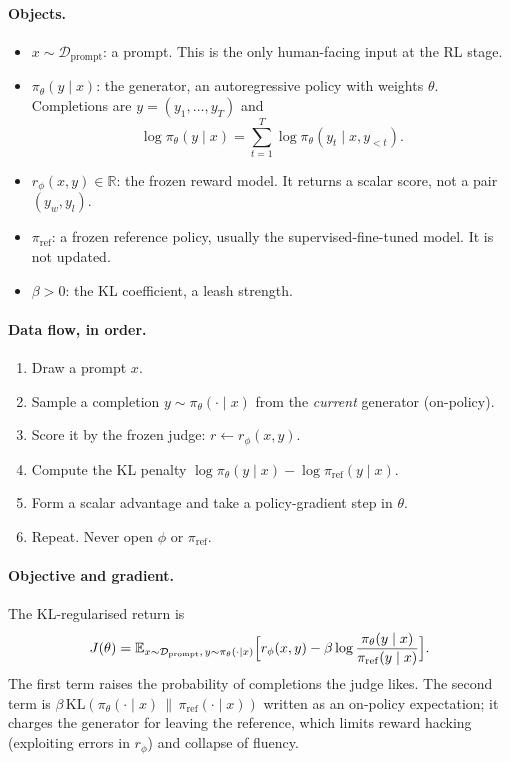\documentclass[11pt,a4paper]{article}
\theoremstyle{definition}
\begin{document}
\paragraph{Objects.}
\begin{itemize}
    \item \(x\sim\mathcal{D}_{\mathrm{prompt}}\): a prompt. This is the only human-facing input at the RL stage.
    \item \(\pi_\theta(y\mid x)\): the generator, an autoregressive policy with weights \(\theta\). Completions are \(y=(y_1,\ldots,y_T)\) and
    \[
    \log\pi_\theta(y\mid x)
    =\sum_{t=1}^{T}\log\pi_\theta(y_t\mid x,y_{<t}).
    \]
    \item \(r_\phi(x,y)\in\mathbb{R}\): the frozen reward model. It returns a scalar score, not a pair \((y_w,y_l)\).
    \item \(\pi_{\mathrm{ref}}\): a frozen reference policy, usually the supervised-fine-tuned model. It is not updated.
    \item \(\beta>0\): the KL coefficient, a leash strength.
\end{itemize}

\paragraph{Data flow, in order.}
\begin{enumerate}
    \item Draw a prompt \(x\).
    \item Sample a completion \(y\sim\pi_\theta(\cdot\mid x)\) from the \emph{current} generator (on-policy).
    \item Score it by the frozen judge: \(r\leftarrow r_\phi(x,y)\).
    \item Compute the KL penalty \(\log\pi_\theta(y\mid x)-\log\pi_{\mathrm{ref}}(y\mid x)\).
    \item Form a scalar advantage and take a policy-gradient step in \(\theta\).
    \item Repeat. Never open \(\phi\) or \(\pi_{\mathrm{ref}}\).
\end{enumerate}

\paragraph{Objective and gradient.}
The KL-regularised return is
\[
J(\theta)
=\mathbb{E}_{x\sim\mathcal{D}_{\mathrm{prompt}},\,y\sim\pi_\theta(\cdot\mid x)}
\Bigl[
r_\phi(x,y)
-\beta\log\frac{\pi_\theta(y\mid x)}{\pi_{\mathrm{ref}}(y\mid x)}
\Bigr].
\]
The first term raises the probability of completions the judge likes. The second term is \(\beta\,\mathrm{KL}(\pi_\theta(\cdot\mid x)\,\|\,\pi_{\mathrm{ref}}(\cdot\mid x))\) written as an on-policy expectation; it charges the generator for leaving the reference, which limits reward hacking (exploiting errors in \(r_\phi\)) and collapse of fluency.
\end{document}
